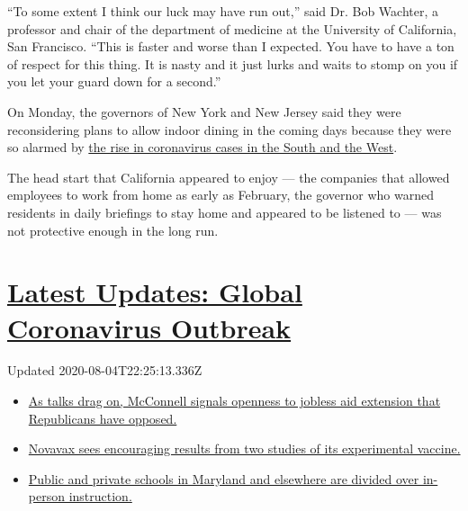 ``To some extent I think our luck may have run out,'' said Dr. Bob
Wachter, a professor and chair of the department of medicine at the
University of California, San Francisco. ``This is faster and worse than
I expected. You have to have a ton of respect for this thing. It is
nasty and it just lurks and waits to stomp on you if you let your guard
down for a second.''

On Monday, the governors of New York and New Jersey said they were
reconsidering plans to allow indoor dining in the coming days because
they were so alarmed by
\href{https://www.nytimes3xbfgragh.onion/2020/06/14/us/coronavirus-united-states.html}{the
rise in coronavirus cases in the South and the West}.

The head start that California appeared to enjoy --- the companies that
allowed employees to work from home as early as February, the governor
who warned residents in daily briefings to stay home and appeared to be
listened to --- was not protective enough in the long run.

\hypertarget{latest-updates-global-coronavirus-outbreak}{%
\section{\texorpdfstring{\href{https://www.nytimes3xbfgragh.onion/2020/08/04/world/coronavirus-cases.html?action=click\&pgtype=Article\&state=default\&region=MAIN_CONTENT_1\&context=storylines_live_updates}{Latest
Updates: Global Coronavirus
Outbreak}}{Latest Updates: Global Coronavirus Outbreak}}\label{latest-updates-global-coronavirus-outbreak}}

Updated 2020-08-04T22:25:13.336Z

\begin{itemize}
\tightlist
\item
  \href{https://www.nytimes3xbfgragh.onion/2020/08/04/world/coronavirus-cases.html?action=click\&pgtype=Article\&state=default\&region=MAIN_CONTENT_1\&context=storylines_live_updates\#link-2daa96b5}{As
  talks drag on, McConnell signals openness to jobless aid extension
  that Republicans have opposed.}
\item
  \href{https://www.nytimes3xbfgragh.onion/2020/08/04/world/coronavirus-cases.html?action=click\&pgtype=Article\&state=default\&region=MAIN_CONTENT_1\&context=storylines_live_updates\#link-1228a480}{Novavax
  sees encouraging results from two studies of its experimental
  vaccine.}
\item
  \href{https://www.nytimes3xbfgragh.onion/2020/08/04/world/coronavirus-cases.html?action=click\&pgtype=Article\&state=default\&region=MAIN_CONTENT_1\&context=storylines_live_updates\#link-4825b93}{Public
  and private schools in Maryland and elsewhere are divided over
  in-person instruction.}
\end{itemize}

